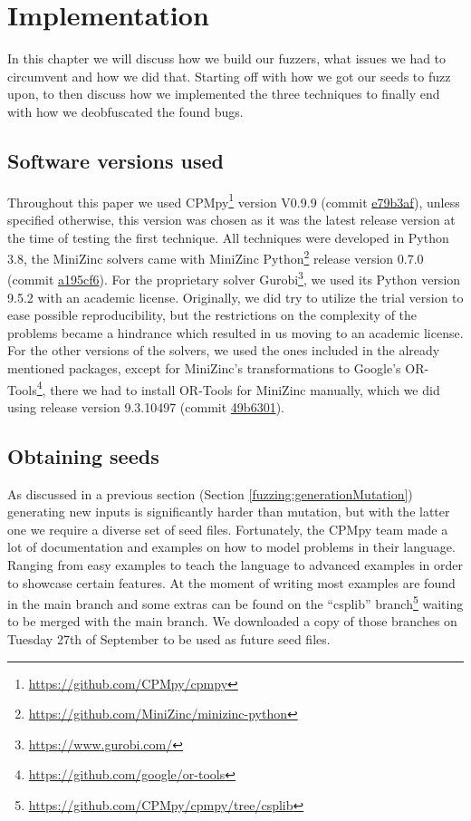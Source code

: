 \chapter{Implementation}
\label{cha:5:impl}
\label{impl:Intro}
In this chapter we will discuss how we build our fuzzers, what issues we had to circumvent and how we did that. Starting off with how we got our seeds to fuzz upon, to then discuss how we implemented the three techniques to finally end with how we deobfuscated the found bugs.

\section{Software versions used}
\label{impl:softwareVersion}
Throughout this paper we used CPMpy\footnote{\url{https://github.com/CPMpy/cpmpy}} version V0.9.9 (commit \href{https://github.com/CPMpy/cpmpy/commit/e79b3afedc934a9437c2ddb3a9f54d7e2d7bd3ee}{e79b3af}), unless specified otherwise, this version was chosen as it was the latest release version at the time of testing the first technique. All techniques were developed in Python 3.8, the MiniZinc solvers came with MiniZinc Python\footnote{\url{https://github.com/MiniZinc/minizinc-python}} release version 0.7.0 (commit \href{https://github.com/MiniZinc/minizinc-python/commit/a195cf63fcfbc98665d70ab64efb5424db25bd7e}{a195cf6}). For the proprietary solver Gurobi\footnote{\url{https://www.gurobi.com/}}, we used its Python version 9.5.2 with an academic license. 
Originally, we did try to utilize the trial version to ease possible reproducibility, but the restrictions on the complexity of the problems became a hindrance which resulted in us moving to an academic license. For the other versions of the solvers, we used the ones included in the already mentioned packages, except for MiniZinc’s transformations to Google’s OR-Tools\footnote{\url{https://github.com/google/or-tools}}, there we had to install OR-Tools for MiniZinc manually, which we did using release version 9.3.10497 (commit \href{https://github.com/google/or-tools/commit/49b6301e1e1e231d654d79b6032e79809868a70e}{49b6301}).


\section{Obtaining seeds}
\label{impl:obtainingSeeds}
As discussed in a previous section (Section \ref{fuzzing:generationMutation}) generating new inputs is significantly harder than mutation, but with the latter one we require a diverse set of seed files. Fortunately, the CPMpy team made a lot of documentation and examples on how to model problems in their language. Ranging from easy examples to teach the language to advanced examples in order to showcase certain features. 
At the moment of writing most examples are found in the main branch and some extras can be found on the “csplib” branch\footnote{\url{https://github.com/CPMpy/cpmpy/tree/csplib}} waiting to be merged with the main branch. We downloaded a copy of those branches on Tuesday 27th of September to be used as future seed files. 

